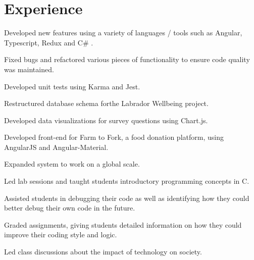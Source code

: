 \documentclass[]{deedy-resume-openfont}
\begin{document}
\begin{minipage}[t]{0.66\textwidth} 


\section{Experience}

\vspace{\topsep}
\begin{tightemize}\item Developed new features using a variety of languages / tools such as Angular, Typescript, Redux and C# .
\item Fixed bugs and refactored various pieces of functionality to ensure code quality was maintained. 
\item Developed unit tests using Karma and Jest.

\end{tightemize}
\sectionsep

\begin{tightemize}
\item Restructured database schema forthe Labrador Wellbeing project.\item Developed data visualizations for survey questions using Chart.js.\end{tightemize}
\sectionsep

\begin{tightemize}
\item Developed front-end for Farm to Fork, a food donation platform, using AngularJS and Angular-Material. \item Expanded system to work on a global scale. \end{tightemize}
\sectionsep

\begin{tightemize}
\item Led lab sessions and taught students introductory programming concepts in C.\item Assisted students in debugging their code as well as identifying how they could better
debug their own code in the future.\item Graded assignments, giving students detailed information on how they could improve
their coding style and logic.
\item Led class discussions about the impact of technology on society.\end{tightemize}


\end{minipage}
\end{document}
